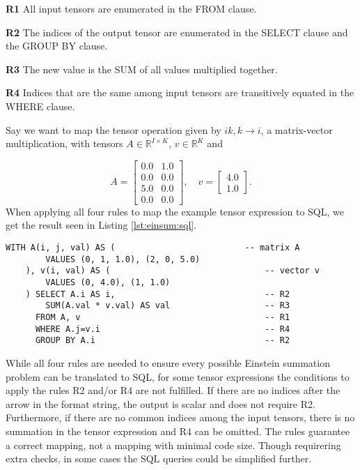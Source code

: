\begin{description}
    \item \textbf{R1} All input tensors are enumerated in the FROM clause.
    \item \textbf{R2} The indices of the output tensor are enumerated in the SELECT clause 
    and the GROUP BY clause.
    \item \textbf{R3} The new value is the SUM of all values multiplied together.
    \item \textbf{R4} Indices that are the same among input tensors are transitively equated 
    in the WHERE clause.
\end{description}
%
Say we want to map the tensor operation given by $ik,k \rightarrow i$, a matrix-vector 
multiplication, with tensors $A \in \mathbb{R}^{I \times K}$, $v \in \mathbb{R}^{K}$ and 

\begin{equation*}
    A =
    \begin{bmatrix}
        0.0 & 1.0 \\
        0.0 & 0.0 \\
        5.0 & 0.0 \\
        0.0 & 0.0
    \end{bmatrix},
    \quad
    v =
    \begin{bmatrix}
        4.0 \\
        1.0
    \end{bmatrix}.
\end{equation*}
%
When applying all four rules to map the example tensor expression to SQL, we get the result
seen in Listing \ref{lst:einsum:sql}.

\begin{lstlisting}[caption={Einstein summation in SQL.}, captionpos={t}, label={lst:einsum:sql}]
    WITH A(i, j, val) AS (                          -- matrix A
        VALUES (0, 1, 1.0), (2, 0, 5.0)
    ), v(i, val) AS (                               -- vector v
        VALUES (0, 4.0), (1, 1.0)
    ) SELECT A.i AS i,                              -- R2
        SUM(A.val * v.val) AS val                   -- R3
      FROM A, v                                     -- R1
      WHERE A.j=v.i                                 -- R4
      GROUP BY A.i                                  -- R2
\end{lstlisting}
%
While all four rules are needed to ensure every possible Einstein summation problem 
can be translated to SQL, for some tensor expressions the conditions to apply the rules
R2 and/or R4 are not fulfilled. If there are no indices after the arrow in the format 
string, the output is scalar and does not require R2. Furthermore, if there are no common
indices among the input tensors, there is no summation in the tensor expression and R4
can be omitted. The rules guarantee a correct mapping, not a mapping with minimal code size.
Though requirering extra checks, in some cases the SQL queries could be simplified further.

